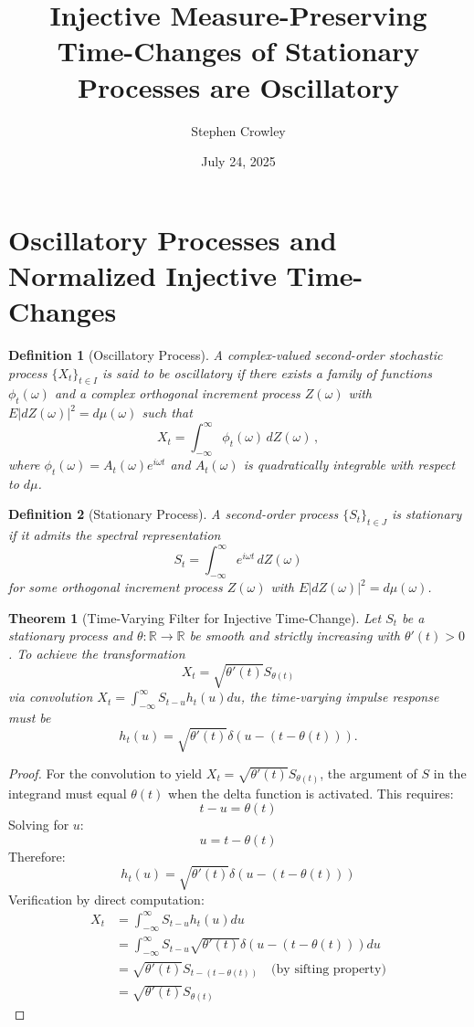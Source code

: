 \documentclass{article}
\title{Injective Measure-Preserving Time-Changes of Stationary Processes are Oscillatory}
\author{Stephen Crowley}
\date{July 24, 2025}
\newtheorem{definition}{Definition}
\newtheorem{theorem}{Theorem}
\begin{document}
\maketitle

\section*{Oscillatory Processes and Normalized Injective Time-Changes}

\begin{definition}[Oscillatory Process]
A complex-valued second-order stochastic process $\{X_t\}_{t\in I}$ is said to be oscillatory if there exists a family of functions $\phi_t(\omega)$ and a complex orthogonal increment process $Z(\omega)$ with $E|dZ(\omega)|^2 = d\mu(\omega)$ such that
\[
X_t = \int_{-\infty}^\infty \phi_t(\omega) \, dZ(\omega)\,,
\]
where $\phi_t(\omega) = A_t(\omega) e^{i\omega t}$ and $A_t(\omega)$ is quadratically integrable with respect to $d\mu$.
\end{definition}

\begin{definition}[Stationary Process]
A second-order process $\{S_t\}_{t\in J}$ is stationary if it admits the spectral representation
\[
S_t = \int_{-\infty}^\infty e^{i\omega t}\,dZ(\omega)
\]
for some orthogonal increment process $Z(\omega)$ with $E|dZ(\omega)|^2 = d\mu(\omega)$.
\end{definition}

\begin{theorem}[Time-Varying Filter for Injective Time-Change]
Let $S_t$ be a stationary process and $\theta: \mathbb{R} \to \mathbb{R}$ be smooth and strictly increasing with $\theta'(t) > 0$. To achieve the transformation
\[
X_t = \sqrt{\theta'(t)} S_{\theta(t)}
\]
via convolution $X_t = \int_{-\infty}^\infty S_{t-u} h_t(u) du$, the time-varying impulse response must be
\[
h_t(u) = \sqrt{\theta'(t)} \delta(u - (t - \theta(t))).
\]
\end{theorem}

\begin{proof}
For the convolution to yield $X_t = \sqrt{\theta'(t)} S_{\theta(t)}$, the argument of $S$ in the integrand must equal $\theta(t)$ when the delta function is activated. This requires:
\[
t - u = \theta(t)
\]
Solving for $u$:
\[
u = t - \theta(t)
\]
Therefore:
\[
h_t(u) = \sqrt{\theta'(t)} \delta(u - (t - \theta(t)))
\]
Verification by direct computation:
\begin{align}
X_t &= \int_{-\infty}^\infty S_{t-u} h_t(u) du \\
&= \int_{-\infty}^\infty S_{t-u} \sqrt{\theta'(t)} \delta(u - (t - \theta(t))) du \\
&= \sqrt{\theta'(t)} S_{t - (t - \theta(t))} \quad \text{(by sifting property)} \\
&= \sqrt{\theta'(t)} S_{\theta(t)}
\end{align}
\end{proof}
\end{document}
